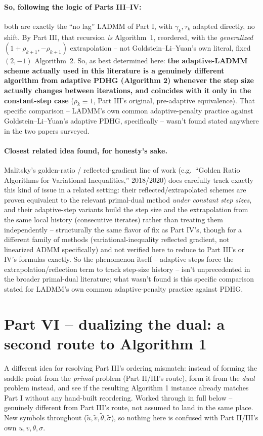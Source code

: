 \documentclass[11pt]{article}
\begin{document}
\paragraph{So, following the logic of Parts III--IV:} both are exactly the ``no lag''
LADMM of Part I, with $\gamma_k,\tau_k$ adapted directly, no shift. By Part III, that
recursion \emph{is} Algorithm~1, reordered, with the \emph{generalized}
$(1+\rho_{k+1},-\rho_{k+1})$ extrapolation -- not Goldstein--Li--Yuan's own literal,
fixed $(2,-1)$ Algorithm~2. So, as best determined here: \textbf{the adaptive-LADMM
scheme actually used in this literature is a genuinely different algorithm from
adaptive PDHG (Algorithm 2) whenever the step size actually changes between
iterations, and coincides with it only in the constant-step case} ($\rho_k\equiv1$,
Part III's original, pre-adaptive equivalence). That specific comparison -- LADMM's own
common adaptive-penalty practice against Goldstein--Li--Yuan's adaptive PDHG,
specifically -- wasn't found stated anywhere in the two papers surveyed.

\paragraph{Closest related idea found, for honesty's sake.} Malitsky's golden-ratio /
reflected-gradient line of work (e.g.\ ``Golden Ratio Algorithms for Variational
Inequalities,'' 2018/2020) does carefully track exactly this kind of issue in a related
setting: their reflected/extrapolated schemes are proven equivalent to the relevant
primal-dual method \emph{under constant step sizes}, and their adaptive-step variants
build the step size and the extrapolation from the same local history (consecutive
iterates) rather than treating them independently -- structurally the same flavor of
fix as Part IV's, though for a different family of methods (variational-inequality
reflected gradient, not linearized ADMM specifically) and not verified here to reduce
to Part III's or IV's formulas exactly. So the phenomenon itself -- adaptive steps
force the extrapolation/reflection term to track step-size history -- isn't
unprecedented in the broader primal-dual literature; what wasn't found is this specific
comparison stated for LADMM's own common adaptive-penalty practice against PDHG.

\section*{Part VI -- dualizing the dual: a second route to Algorithm 1}
A different idea for resolving Part III's ordering mismatch: instead of forming the
saddle point from the \emph{primal} problem (Part II/III's route), form it from the
\emph{dual} problem instead, and see if the resulting Algorithm 1 instance already
matches Part I without any hand-built reordering. Worked through in full below --
genuinely different from Part III's route, not assumed to land in the same place.
New symbols throughout ($\tilde u,\tilde v,\tilde\theta,\tilde\sigma$), so nothing here
is confused with Part II/III's own $u,v,\theta,\sigma$.
\end{document}

